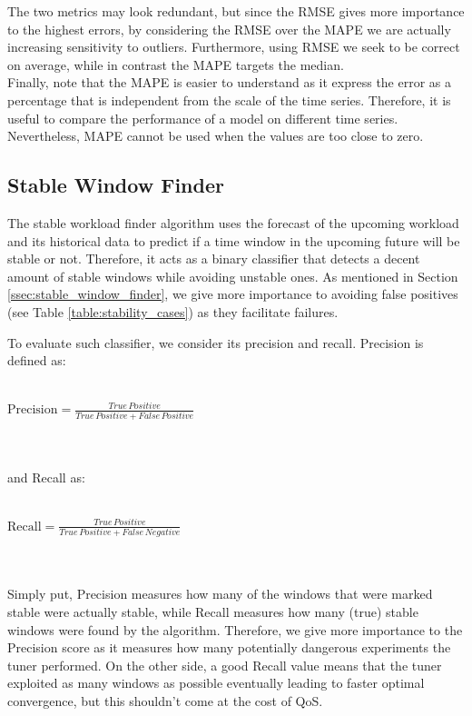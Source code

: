 \documentclass[a4paper, 12pt]{article} %
\begin{document}
	The two metrics may look redundant, but since the RMSE gives more importance to the highest errors, by considering the RMSE over the MAPE we are actually increasing sensitivity to outliers. Furthermore, using RMSE we seek to be correct on average, while in contrast the MAPE targets the median.\\
	Finally, note that the MAPE is easier to understand as it express the error as a percentage that is independent from the scale of the time series. Therefore, it is useful to compare the performance of a model on different time series. Nevertheless, MAPE cannot be used when the values are too close to zero.
	
	\subsection{Stable Window Finder } \label{ssec:exp_stable_wkld_finder}
	The stable workload finder algorithm uses the forecast of the upcoming workload and its historical data to predict if a time window in the upcoming future will be stable or not. Therefore, it acts as a binary classifier that detects a decent amount of stable windows while avoiding unstable ones. As mentioned in Section \ref{ssec:stable_window_finder}, we give more importance to avoiding false positives (see Table \ref{table:stability_cases}) as they facilitate failures.
	
	To evaluate such classifier, we consider its precision and recall. Precision is defined as:\\\\
	\centerline{
	$
	\text{Precision} = \frac{ True \, Positive}{ True \, Positive + False \, Positive}
	$
	}\\\\
	and Recall as:\\\\
	\centerline{
		$
		\text{Recall} = \frac{ True \, Positive}{ True \, Positive + False \, Negative}
		$
	}\\\\
	Simply put, Precision measures how many of the windows that were marked stable were actually stable, while Recall measures how many (true) stable windows were found by the algorithm. Therefore, we give more importance to the Precision score as it measures how many potentially dangerous experiments the tuner performed. On the other side, a good Recall value means that the tuner exploited as many windows as possible eventually leading to faster optimal convergence, but this shouldn't come at the cost of QoS.
	
\end{document}
